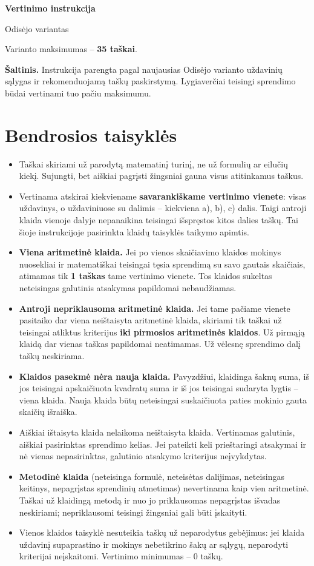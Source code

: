 \documentclass[11pt,a4paper]{article}
\begin{document}
\begin{center}
{\LARGE\bfseries Vertinimo instrukcija}\par
{\large Odisėjo variantas}\par
Varianto maksimumas -- \textbf{35 taškai}.
\end{center}
\textbf{Šaltinis.} Instrukcija parengta pagal naujausias Odisėjo varianto uždavinių sąlygas ir rekomenduojamą taškų paskirstymą. Lygiaverčiai teisingi sprendimo būdai vertinami tuo pačiu maksimumu.

\section*{Bendrosios taisyklės}
\begin{itemize}
\item Taškai skiriami už parodytą matematinį turinį, ne už formulių ar eilučių kiekį. Sujungti, bet aiškiai pagrįsti žingsniai gauna visus atitinkamus taškus.
\item Vertinama atskirai kiekviename \textbf{savarankiškame vertinimo vienete}: visas uždavinys, o uždaviniuose su dalimis -- kiekviena a), b), c) dalis. Taigi antroji klaida vienoje dalyje nepanaikina teisingai išspręstos kitos dalies taškų. Tai šioje instrukcijoje pasirinkta klaidų taisyklės taikymo apimtis.
\item \textbf{Viena aritmetinė klaida.} Jei po vienos skaičiavimo klaidos mokinys nuosekliai ir matematiškai teisingai tęsia sprendimą su savo gautais skaičiais, atimamas tik \textbf{1 taškas} tame vertinimo vienete. Tos klaidos sukeltas neteisingas galutinis atsakymas papildomai nebaudžiamas.
\item \textbf{Antroji nepriklausoma aritmetinė klaida.} Jei tame pačiame vienete pasitaiko dar viena neištaisyta aritmetinė klaida, skiriami tik taškai už teisingai atliktus kriterijus \textbf{iki pirmosios aritmetinės klaidos}. Už pirmąją klaidą dar vienas taškas papildomai neatimamas. Už vėlesnę sprendimo dalį taškų neskiriama.
\item \textbf{Klaidos pasekmė nėra nauja klaida.} Pavyzdžiui, klaidinga šaknų suma, iš jos teisingai apskaičiuota kvadratų suma ir iš jos teisingai sudaryta lygtis -- viena klaida. Nauja klaida būtų neteisingai suskaičiuota paties mokinio gauta skaičių išraiška.
\item Aiškiai ištaisyta klaida nelaikoma neištaisyta klaida. Vertinamas galutinis, aiškiai pasirinktas sprendimo kelias. Jei pateikti keli prieštaringi atsakymai ir nė vienas nepasirinktas, galutinio atsakymo kriterijus neįvykdytas.
\item \textbf{Metodinė klaida} (neteisinga formulė, neteisėtas dalijimas, neteisingas keitinys, nepagrįstas sprendinių atmetimas) nevertinama kaip vien aritmetinė. Taškai už klaidingą metodą ir nuo jo priklausomas nepagrįstas išvadas neskiriami; nepriklausomi teisingi žingsniai gali būti įskaityti.
\item Vienos klaidos taisyklė nesuteikia taškų už neparodytus gebėjimus: jei klaida uždavinį supaprastino ir mokinys nebetikrino šakų ar sąlygų, neparodyti kriterijai neįskaitomi. Vertinimo minimumas -- 0 taškų.
\end{itemize}
\end{document}
